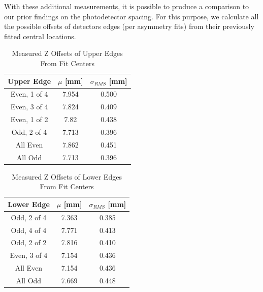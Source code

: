 With these additional measurements, it is possible to produce a comparison to our prior findings on the photodetector spacing. For this purpose, we calculate all the possible offsets of detectors edges (per asymmetry fits) from their previously fitted central locations. 
\begin{table}[H]
    \centering
    \begin{tabular}{c||c|c}
        \bf Upper Edge & \bf \boldmath$\mu$ [mm] & \bf \boldmath$\sigma_{RMS}$ [mm] \\
         \hline
        Even, 1 of 4 & 7.954 & 0.500 \\
        Even, 3 of 4 & 7.824 & 0.409 \\
        Even, 1 of 2 & 7.82 & 0.438  \\
        Odd, 2 of 4 & 7.713 & 0.396  \\
        \hline
        All Even & 7.862 & 0.451 \\
        All Odd & 7.713 & 0.396
    \end{tabular}
    \caption{Measured Z Offsets of Upper Edges From Fit Centers}
    \label{tab:upperedgeasymz}
\end{table}
\begin{table}[H]
    \centering
    \begin{tabular}{c||c|c}
         \bf Lower Edge & \bf \boldmath$\mu$ [mm] & \bf \boldmath$\sigma_{RMS}$ [mm] \\
         \hline
         Odd, 2 of 4 & 7.363 & 0.385 \\
         Odd, 4 of 4 & 7.771 & 0.413 \\
         Odd, 2 of 2 & 7.816 & 0.410 \\
         Even, 3 of 4 & 7.154 & 0.436 \\
         \hline 
         All Even & 7.154 & 0.436 \\
         All Odd & 7.669 & 0.448
    \end{tabular}
    \caption{Measured Z Offsets of Lower Edges From Fit Centers}
    \label{tab:loweredgeasymz}
\end{table}

